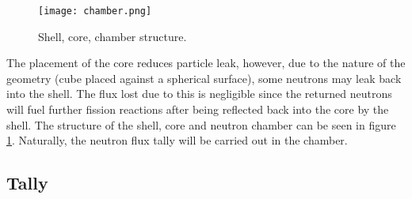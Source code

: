 \begin{figure}[!htbp]
\caption{Shell, core, chamber structure.}
\label{fig:chamber}
\centering
\texttt{[image: chamber.png]}
\end{figure}

The placement of the core reduces particle leak, however, due to the nature of the geometry (cube placed against a spherical surface), some neutrons may leak back into the shell. The flux lost due to this is negligible since the returned neutrons will fuel further fission reactions after being reflected back into the core by the shell. The structure of the shell, core and neutron chamber can be seen in figure \ref{fig:chamber}. Naturally, the neutron flux tally will be carried out in the chamber.

\subsection{Tally}

